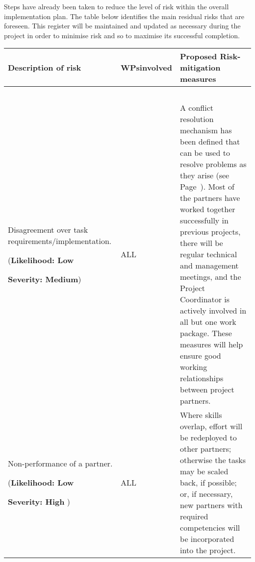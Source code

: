 \documentclass[a4paper,11pt]{article}
\begin{document}
\bigskip
Steps have already been taken to reduce the level of risk within the overall implementation plan.  The table below
identifies the main residual risks that are foreseen.  This register will be maintained
and updated as necessary during the project in order to minimise risk and so to maximise its successful completion.

\bigskip

\begin{longtable}{| p{3.5cm} | p{1.5cm} | p{11.8cm}  |}  \hline
\textbf{Description of risk} & \textbf{WPs\newline involved} & \textbf{Proposed Risk-mitigation measures} \\ \hline
\multicolumn{3}{l}{\ }
\\\hline

Disagreement over task requirements/implementation.
\par
(\textbf{Likelihood: Low}
\par
\textbf{Severity: Medium})
& ALL &
A conflict resolution mechanism has been defined that can be used to resolve
problems as they arise (see Page~\pageref{conflict-resolution}).
Most of the partners have worked together
successfully in previous projects, there will be regular technical
and management meetings, and the Project Coordinator
is actively involved in all but one work package.  These measures will help ensure
good working relationships between project partners.

\\\hline
Non-performance of a partner.
\par
(\textbf{Likelihood: Low}
\par
\textbf{Severity: High}
)
& ALL & 
Where skills overlap, 
effort will be redeployed to other partners;
otherwise the tasks may be scaled back, if possible; or,
if necessary, new partners with required competencies will be
incorporated into the project.


\end{longtable}
\end{document}
